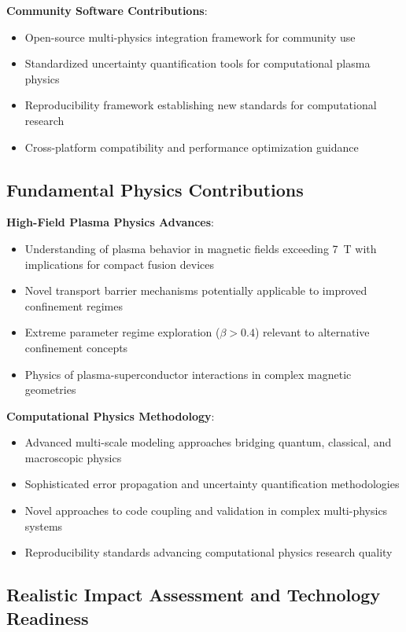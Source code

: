 \documentclass[10pt,twocolumn]{article}
\begin{document}
\textbf{Community Software Contributions}:
\begin{itemize}
\item Open-source multi-physics integration framework for community use
\item Standardized uncertainty quantification tools for computational plasma physics
\item Reproducibility framework establishing new standards for computational research
\item Cross-platform compatibility and performance optimization guidance
\end{itemize}

\subsection{Fundamental Physics Contributions}

\textbf{High-Field Plasma Physics Advances}:
\begin{itemize}
\item Understanding of plasma behavior in magnetic fields exceeding 7~T with implications for compact fusion devices
\item Novel transport barrier mechanisms potentially applicable to improved confinement regimes
\item Extreme parameter regime exploration ($\beta > 0.4$) relevant to alternative confinement concepts
\item Physics of plasma-superconductor interactions in complex magnetic geometries
\end{itemize}

\textbf{Computational Physics Methodology}:
\begin{itemize}
\item Advanced multi-scale modeling approaches bridging quantum, classical, and macroscopic physics
\item Sophisticated error propagation and uncertainty quantification methodologies
\item Novel approaches to code coupling and validation in complex multi-physics systems
\item Reproducibility standards advancing computational physics research quality
\end{itemize}

\subsection{Realistic Impact Assessment and Technology Readiness}
\end{document}
